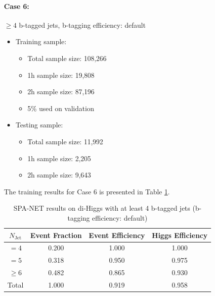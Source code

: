 \documentclass[12pt]{article}
\begin{document}
		\paragraph{Case 6:}$\ge 4$ b-tagged jets, b-tagging efficiency: default 
		\begin{itemize}
			\item Training sample:
			\begin{itemize}
				\item Total sample size: 108,266
				\item 1h sample size: 19,808
				\item 2h sample size: 87,196
				\item 5\% used on validation
			\end{itemize}
			\item Testing sample: 
				\begin{itemize}
					\item Total sample size: 11,992
					\item 1h sample size: 2,205
					\item 2h sample size: 9,643
				\end{itemize}
		\end{itemize}

		The training results for Case 6 is presented in Table \ref{tab:SPANet_4btag_default}.
		\begin{table}[htpb]
			\centering
			\caption{SPA-NET results on di-Higgs with at least 4 b-tagged jets (b-tagging efficiency: default)}
			\label{tab:SPANet_4btag_default}
			\begin{tabular}{c|c|cc}
				$N_\text{Jet}$ & Event Fraction & Event Efficiency & Higgs Efficiency \\
				\hline
				$=4$	  &   0.200      &    1.000    &   1.000  \\
				$=5$	  &   0.318      &    0.950    &   0.975  \\
				$\ge 6$	  &   0.482      &    0.865    &   0.930  \\
				Total	  &   1.000      &    0.919    &   0.958  \\
			\end{tabular}
		\end{table}
\end{document}
